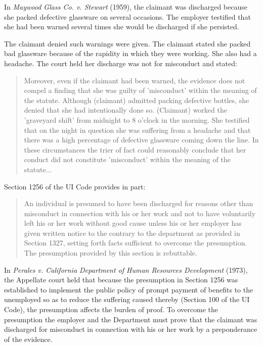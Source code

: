 \documentclass[12pt]{article}
\newcommand{\1}{\mathbf{1}}
\begin{document}
\begin{appendix}
\begin{enumerate}
In \emph{Maywood Glass Co. v. Stewart} (1959), the claimant was discharged because she packed defective glassware on several occasions. The employer testified that she had been warned several times she would be discharged if she persisted.

The claimant denied such warnings were given. The claimant stated she packed bad glassware because of the rapidity in which they were working. She also had a headache. The court held her discharge was not for misconduct and stated:
\begin{quotation}
Moreover, even if the claimant had been warned, the evidence does not compel a finding that she was guilty of 'misconduct' within the meaning of the statute. Although (claimant) admitted packing defective bottles, she denied that she had intentionally done so. (Claimant) worked the 'graveyard shift' from midnight to 8 o'clock in the morning. She testified that on the night in question she was suffering from a headache and that there was a high percentage of defective glassware coming down the line. In these circumstances the trier of fact could reasonably conclude that her conduct did not constitute 'misconduct' within the meaning of the statute...
\end{quotation}


\end{enumerate}



\vspace{0.5cm}

\smallskip

Section 1256 of the UI Code provides in part:
\begin{quotation}
An individual is presumed to have been discharged for reasons other than misconduct in connection with his or her work and not to have voluntarily left his or her work without good cause unless his or her employer has given written notice to the contrary to the department as provided in Section 1327, setting forth facts sufficient to overcome the presumption. The presumption provided by this section is rebuttable.
\end{quotation}

In \emph{Perales v. California Department of Human Resources Development} (1973), the Appellate court held that because the presumption in Section 1256 was established to implement the public policy of prompt payment of benefits to the unemployed so as to reduce the suffering caused thereby (Section 100 of the UI Code), the presumption affects the burden of proof. To overcome the presumption the employer and the Department must prove that the claimant was discharged for misconduct in connection with his or her work by a preponderance of the evidence.


\end{appendix}
\end{document}
